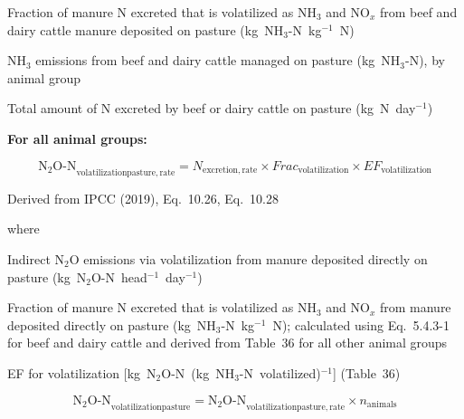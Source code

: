 \begin{description}[font=\normalfont, leftmargin=12em, style=nextline, nosep]
    \item[$\mathit{Frac}_{\mathrm{volatilization}}$]
        Fraction of manure N excreted that is volatilized as NH$_3$ and NO$_x$
        from beef and dairy cattle manure deposited on pasture
        (kg~NH$_3$-N~kg$^{-1}$~N)
    \item[$\mathrm{NH_3\text{-}N}_{\mathrm{pasture}}$]
        NH$_3$ emissions from beef and dairy cattle managed on pasture
        (kg~NH$_3$-N), by animal group
    \item[$N_{\mathrm{excretion}}$]
        Total amount of N excreted by beef or dairy cattle on pasture
        (kg~N~day$^{-1}$)
\end{description}

\bigskip
\noindent\textbf{For all animal groups:}

\begin{equation}
    \mathrm{N_2O\text{-}N}_{\mathrm{volatilizationpasture,rate}}
        = N_{\mathrm{excretion,rate}}
          \times \mathit{Frac}_{\mathrm{volatilization}}
          \times \mathit{EF}_{\mathrm{volatilization}}
    \tag{Eq.\ 5.4.3-2}
\end{equation}

\noindent Derived from IPCC (2019), Eq.~10.26, Eq.~10.28

\noindent where

\begin{description}[font=\normalfont, leftmargin=12em, style=nextline, nosep]
    \item[$\mathrm{N_2O\text{-}N}_{\mathrm{volatilizationpasture,rate}}$]
        Indirect N$_2$O emissions via volatilization from manure deposited
        directly on pasture (kg~N$_2$O-N~head$^{-1}$~day$^{-1}$)
    \item[$\mathit{Frac}_{\mathrm{volatilization}}$]
        Fraction of manure N excreted that is volatilized as NH$_3$ and NO$_x$
        from manure deposited directly on pasture (kg~NH$_3$-N~kg$^{-1}$~N);
        calculated using Eq.~5.4.3-1 for beef and dairy cattle and derived from
        Table~36 for all other animal groups
    \item[$\mathit{EF}_{\mathrm{volatilization}}$]
        EF for volatilization [kg~N$_2$O-N~(kg~NH$_3$-N~volatilized)$^{-1}$]
        (Table~36)
\end{description}

\begin{equation}
    \mathrm{N_2O\text{-}N}_{\mathrm{volatilizationpasture}}
        = \mathrm{N_2O\text{-}N}_{\mathrm{volatilizationpasture,rate}}
          \times n_{\mathrm{animals}}
    \tag{Eq.\ 5.4.3-3}
\end{equation}

